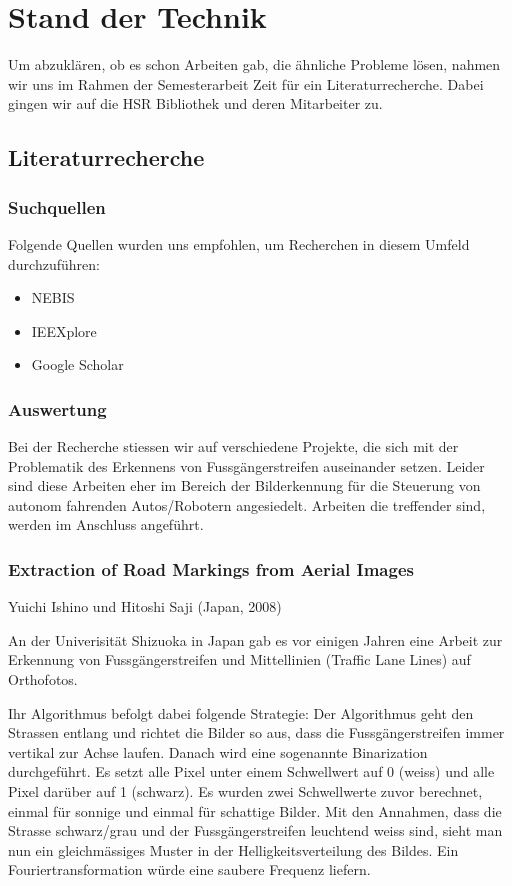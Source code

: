 \section{Stand der Technik}
Um abzuklären, ob es schon Arbeiten gab, die ähnliche Probleme lösen, nahmen wir uns im Rahmen der Semesterarbeit Zeit für ein Literaturrecherche. Dabei gingen wir auf die HSR Bibliothek und deren Mitarbeiter zu.
\subsection{Literaturrecherche}
\subsubsection{Suchquellen}
Folgende Quellen wurden uns empfohlen, um Recherchen in diesem Umfeld durchzuführen:
\begin{itemize}
	\item NEBIS \cite{NEBIS}
    \item IEEXplore \cite{IEEXplore}
    \item Google Scholar \cite{GoogleScholar}
\end{itemize}

\subsubsection{Auswertung}
Bei der Recherche stiessen wir auf verschiedene Projekte, die sich mit der Problematik des Erkennens von Fussgängerstreifen auseinander setzen. Leider sind diese Arbeiten eher im Bereich der Bilderkennung für die Steuerung von autonom fahrenden Autos/Robotern angesiedelt. Arbeiten die treffender sind, werden im Anschluss angeführt.
\subsubsection{Extraction of Road Markings from Aerial Images}
Yuichi Ishino und Hitoshi Saji (Japan, 2008)\cite{ishino2008extraction} \newline 

An der Univerisität Shizuoka in Japan gab es vor einigen Jahren eine Arbeit zur Erkennung von Fussgängerstreifen und Mittellinien (Traffic Lane Lines) auf Orthofotos.

Ihr Algorithmus befolgt dabei folgende Strategie:
Der Algorithmus geht den Strassen entlang und richtet die Bilder so aus, dass die Fussgängerstreifen immer vertikal zur Achse laufen. Danach wird eine sogenannte Binarization durchgeführt. Es setzt alle Pixel unter einem Schwellwert auf 0 (weiss) und alle Pixel darüber auf 1 (schwarz). Es wurden zwei Schwellwerte zuvor berechnet, einmal für sonnige und einmal für schattige Bilder.
Mit den Annahmen, dass die Strasse schwarz/grau und der Fussgängerstreifen leuchtend weiss sind, sieht man nun ein gleichmässiges Muster in der Helligkeitsverteilung des Bildes. Ein Fouriertransformation würde eine saubere Frequenz liefern.

